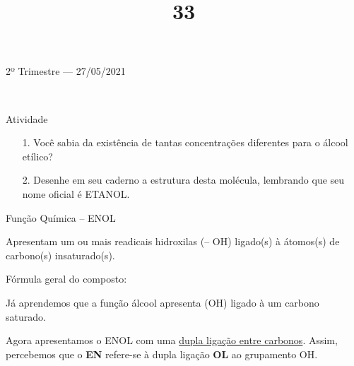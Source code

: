 \documentclass{SchoolBook}
\begin{document}
\begin{day}{2º Trimestre --- 27/05/2021}
\begin{center}
            \vspace{6pt}
             \\
            \textbf{  }
            \vspace{6pt}
            
        \end{center}
        
        \title{3}{Atividade}
        
        \begin{enumerate}
        \item[1.] Você sabia da existência de tantas concentrações diferentes para o álcool etílico?
        
        \item[2.] Desenhe em seu caderno a estrutura desta molécula, lembrando que seu nome oficial é ETANOL. \\
        \end{enumerate}
        
        \title{3}{Função Química -- ENOL}
        
        Apresentam um ou mais readicais hidroxilas (-- OH) ligado(s) à átomos(s) de carbono(s) insaturado(s).
        \vspace{12pt}
        
        \begin{center}
            Fórmula geral do composto: \\[6pt]
        \end{center}
        
        \vspace{12pt}
        Já aprendemos que a função álcool apresenta (OH) ligado à um carbono saturado.
        
        Agora apresentamos o ENOL com uma \underline{dupla ligação entre carbonos}. Assim, percebemos que o \textbf{EN} refere-se à dupla ligação \textbf{OL} ao grupamento OH.
    \end{day}
\end{document}
